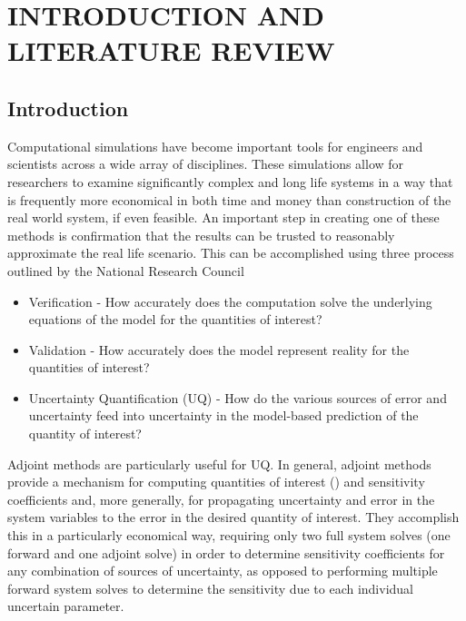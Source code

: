 

\pagestyle{plain} %
\setcounter{page}{1}


\chapter{\uppercase {Introduction and Literature Review}}

\section{Introduction}

Computational simulations have become important tools for engineers and scientists across a wide array of disciplines. These simulations allow for researchers to examine significantly complex and long life systems in a way that is frequently more economical in both time and money than construction of the real world system, if even feasible. An important step in creating one of these methods is confirmation that the results can be trusted to reasonably approximate the real life scenario. This can be accomplished using three process outlined by the National Research Council \cite{NRCVVUQ}


\begin{itemize}
\item Verification - How accurately does the computation solve the underlying equations of the model for the quantities of interest?
\item Validation - How accurately does the model represent reality for the quantities of interest?
\item Uncertainty Quantification (UQ) -  How do the various sources of error and uncertainty feed into uncertainty in the model-based prediction of the quantity of interest?
\end{itemize}


Adjoint methods are particularly useful for UQ. In general, adjoint methods provide a mechanism for computing quantities of interest (\qoi) and sensitivity coefficients and, more generally, for propagating uncertainty and error in the system variables to the error in the desired quantity of interest. They accomplish this in a particularly economical way, requiring only two full system solves (one forward and one adjoint solve) in order to determine sensitivity coefficients for any combination of sources of uncertainty, as opposed to performing multiple forward system solves to determine
the sensitivity due to each individual uncertain parameter.

